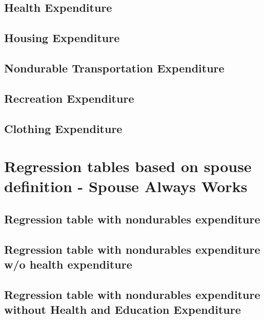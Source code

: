 \documentclass[a4paper,landscape]{article}
\begin{document}
\subsection{Health Expenditure}

\clearpage

\subsection{Housing Expenditure}

\clearpage

\subsection{Nondurable Transportation Expenditure}

\clearpage

\subsection{Recreation Expenditure}

\clearpage

\subsection{Clothing Expenditure}

\clearpage


\section{Regression tables based on spouse definition - Spouse Always Works}

\subsection{Regression table with nondurables expenditure}

\clearpage

\subsection{Regression table with nondurables expenditure w/o health expenditure} 

\clearpage

\subsection{Regression table with nondurables expenditure without Health and Education Expenditure}

\clearpage
\end{document}
